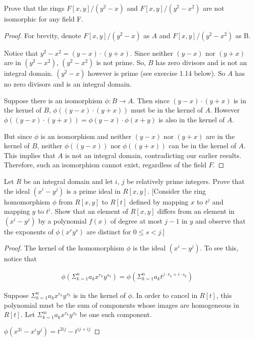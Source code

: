 \documentclass[10pt]{article}
\newenvironment{problem}[2][Problem]{\begin{trivlist}
		\item[\hskip \labelsep {\bfseries #1}\hskip \labelsep {\bfseries #2.}]}{\end{trivlist}}
\begin{document}
	\begin{problem}{1.13}
		Prove that the rings $F[x,y]/(y^2-x)$ and $F[x,y]/(y^2-x^2)$ are not isomorphic for any field F.
		\begin{proof}
			For brevity, denote $F[x,y]/(y^2-x)$ as $A$ and $F[x,y]/(y^2-x^2)$ as B.
			
			Notice that $y^2 - x^2 = (y-x) \cdot (y+x)$. Since neither $(y-x)$ nor $(y+x)$ are in $(y^2 - x^2)$, $(y^2 - x^2)$ is not prime. So, $B$ has zero divisors and is not an integral domain. $(y^2-x)$ however is prime (see exercise 1.14 below). So $A$ has no zero divisors and is an integral domain.
			
			Suppose there is an isomorphism $\phi : B \rightarrow A$. Then since $(y-x) \cdot (y+x)$ is in the kernel of $B$, $\phi((y-x) \cdot (y+x))$ must be in the kernel of $A$. However $\phi((y-x) \cdot (y+x)) = \phi(y-x) \cdot \phi(x+y)$ is also in the kernel of $A$. 
			
			But since $\phi$ is an isomorphism and neither $(y-x)$ nor $(y+x)$ are in the kernel of $B$, neither $\phi((y-x))$ nor $\phi((y+x))$ can be in the kernel of $A$. This implies that $A$ is not an integral domain, contradicting our earlier results. Therefore, such an isomorphism cannot exist, regardless of the field $F$.
		\end{proof}
	\end{problem}
	
	\begin{problem}{1.14}
		Let $R$ be an integral domain and let $i$, $j$ be relatively prime integers. Prove that the ideal $(x^i - y^j)$ is a prime ideal in $R[x,y]$. [Consider the ring homomorphism $\phi$ from $R[x,y]$ to $R[t]$ defined by mapping $x$ to $t^j$ and mapping $y$ to $t^i$. Show that an element of $R[x,y]$ differs from an element in $(x^i - y^j)$ by a polynomial $f(x)$ of degree at most $j-1$ in $y$ and observe that the exponents of $\phi(x^ry^s)$ are distinct for $0 \leq s < j$.]
		\begin{proof}
			The kernel of the homomorphism $\phi$ is the ideal $(x^i - y^j)$. To see this, notice that
			
			\begin{align*}
				\phi(\Sigma^{n}_{k=1} a_k x^{r_k} y^{s_k}) = \phi(\Sigma^{n}_{k=1} a_k t^{j \cdot r_k + i \cdot s_k})
			\end{align*}
			
			Suppose $\Sigma^{n}_{k=1} a_k x^{r_k} y^{s_k}$ is in the kernel of $\phi$. In order to cancel in $R[t]$, this polynomial must be the sum of components whose images are homogeneous in $R[t]$. Let $\Sigma^{m}_{k=1} a_k x^{r_k} y^{s_k}$ be one such component.

			
			
			$\phi(x^{2i} - x^iy^j) = t^{2ij} - t^{ij + ij}$
		\end{proof}
	\end{problem}
	
\end{document}
